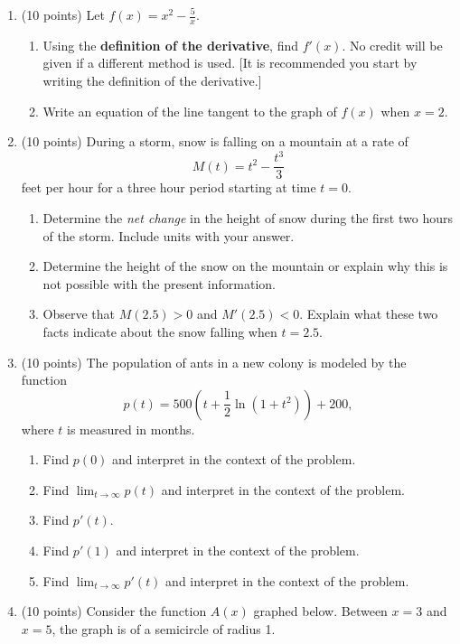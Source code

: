 \documentclass[11pt]{article}
\begin{document}
\newpage
\vspace*{-0.3in}
\begin{enumerate}
\item (10 points) Let $f(x)=x^2-\frac{5}{x}.$
	\begin{enumerate}
	\item Using the \textbf{definition of the derivative}, find $f'(x)$. No credit will be given if a different method is used. [It is recommended you start by writing the definition of the derivative.] 
	\vfill
	\item Write an equation of the line tangent to the graph of $f(x)$ when $x=2.$	
	\vspace{2in}
	\end{enumerate}
\newpage
\item (10 points) During a storm, snow is falling on a mountain at a rate of $$M(t)= t^2-\frac{t^3}{3}$$ feet per hour for a three hour period starting at time $t=0.$
	\begin{enumerate}
	\item Determine the \emph{net change} in the height of snow during the first two hours of the storm. Include  units with your answer.
	\vfill
	\item Determine the height of the snow on the mountain or explain why this is not possible with the present information.
	\vspace{2in}
	\item Observe that $M(2.5)>0$ and $M'(2.5)<0.$ Explain what these two facts indicate about the snow falling when $t=2.5.$
	\vspace{1in}
	\end{enumerate}
\newpage
\item (10 points) The population of ants in a new colony is modeled by the function
$$p(t)=500\left(t+\frac{1}{2} \ln(1+t^2)\right)+200,$$ where $t$ is measured in months. 
	\begin{enumerate}
	\item Find $p(0)$ and interpret in the context of the problem. \\
	\vfill
	 \item Find $\displaystyle \lim_{t \to \infty} p(t)$ and interpret in the context of the problem. \\
	\vfill
	\item Find $p'(t).$ \\
	\vfill
	\item Find $p'(1)$ and interpret in the context of the problem. \\
	\vfill
	\item  Find $\displaystyle \lim_{t \to \infty} p'(t)$ and interpret in the context of the problem. \\
	\vfill
	\end{enumerate}
\newpage
\item (10 points) Consider the function $A(x)$ graphed below. Between $x=3$ and $x=5$, the graph is of a semicircle of radius 1.


\end{enumerate}
\end{document}
